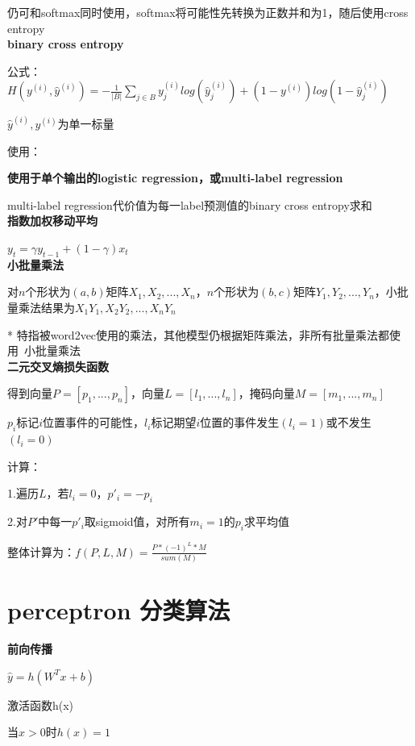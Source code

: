 \documentclass[UTF8]{ctexart}
\begin{document}
  \quad 仍可和softmax同时使用，softmax将可能性先转换为正数并和为1，随后使用cross entropy\\
\textbf{binary cross entropy}

  公式：$H(y^{(i)}, \hat{y}^{(i)}) = -\frac{1}{|B|}\sum_{j \in B} y^{(i)}_jlog(\hat{y}^{(i)}_j) + (1 - y^{(i)})log(1 - \hat{y}^{(i)}_j)$

  \quad $\hat{y}^{(i)}, y^{(i)}$为单一标量
  
  使用：
  
  \quad \textbf{使用于单个输出的logistic regression，或multi-label regression}
  
  \quad multi-label regression代价值为每一label预测值的binary cross entropy求和\\
\textbf{指数加权移动平均}

  $y_t = \gamma y_{t-1}+(1-\gamma)x_t$\\
\textbf{小批量乘法}

  对$n$个形状为$(a, b)$矩阵$X_1, X_2, ..., X_n$，$n$个形状为$(b, c)$矩阵$Y_1, Y_2, ..., Y_n$，小批量乘法结果为$X_1Y_1, X_2Y_2, ..., X_nY_n$

  * 特指被word2vec使用的乘法，其他模型仍根据矩阵乘法，非所有批量乘法都使用\ 小批量乘法\\
\textbf{二元交叉熵损失函数}

  得到向量$P = [p_1, ..., p_n]$，向量$L = [l_1, ..., l_n]$，掩码向量$M = [m_1, ..., m_n]$

  \quad $p_i$标记$i$位置事件的可能性，$l_i$标记期望$i$位置的事件发生$(l_i = 1)$或不发生$(l_i = 0)$

  计算：

  \quad 1.遍历$L$，若$l_i = 0$，$p'_i = -p_i$

  \quad 2.对$P'$中每一$p'_i$取sigmoid值，对所有$m_i = 1$的$p_i$求平均值

  整体计算为：$f(P, L, M) = \frac{P * (-1)^L * M}{sum(M)}$
\section{perceptron 分类算法}
\noindent \textbf{前向传播}

  $\hat{y} = h(W^Tx + b)$
  
  激活函数h(x)

  \quad 当$x > 0$时$h(x) = 1$
\end{document}
